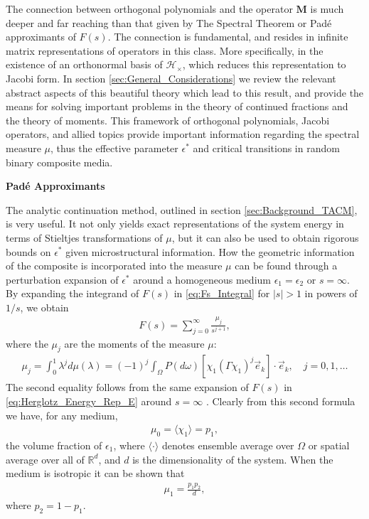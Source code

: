 \documentclass[english,12pt]{ttuthes}
\begin{document}
The connection between orthogonal polynomials and the operator
$\mathbf{M}$ is much deeper and far reaching than that given by The
Spectral Theorem or Pad\'{e} approximants of $F(s)$. The connection is
fundamental, and resides in infinite 
matrix representations of operators in this class. More specifically,
in the existence of an orthonormal basis of $\mathscr{H}_\times$, which
reduces this representation to Jacobi form. In
section \ref{sec:General_Considerations} we review the relevant
abstract aspects of this beautiful theory which lead to this
result, and provide the means for solving important problems in the
theory of continued fractions and the theory of moments. This
framework of orthogonal polynomials, Jacobi operators, and allied topics
provide important information regarding the spectral measure $\mu$, thus
the effective parameter $\epsilon^*$ and critical transitions in random binary
composite media.    

\noindent \textbf{Pad\'{e} Approximants}

The analytic continuation method, outlined in section
\ref{sec:Background_TACM}, is very useful. It not only yields exact
representations of the system energy in terms of Stieltjes
transformations of $\mu$, but it can also be used to obtain rigorous bounds
on $\epsilon^*$ given microstructural information. How the geometric
information of the composite is incorporated into 
the measure $\mu$ can be found through a perturbation expansion of $\epsilon^*$
around a homogeneous medium $\epsilon_1=\epsilon_2$ or $s=\infty$. By expanding the
integrand of $F(s)$ in \eqref{eq:Fs_Integral} for $|s|>1$ in powers of
$1/s$, we obtain \cite{Golden:JMP-5627}
%
\begin{align}\label{eq:Fs_near_infinity}
  F(s)=\sum_{j=0}^\infty\frac{\mu_j}{s^{j+1}},
\end{align}
%
where the $\mu_j$ are the moments of the measure $\mu$:
%
\begin{align}\label{eq:moments_mu}
  \mu_j=\int_0^1\lambda^jd\mu(\lambda)
     =(-1)^j\int_\Omega P(d\omega)[\chi_1(\Gamma\chi_1)^j\vec{e}_k]\cdot\vec{e}_k,
     \quad j=0,1,\ldots
\end{align}
%
The second equality follows from the same expansion of $F(s)$ in
\eqref{eq:Herglotz_Energy_Rep_E} around $s=\infty$
\cite{Golden:JMP-5627}. Clearly from this second formula we have, for
any medium, 
%
\begin{align}
\mu_0=\langle\chi_1\rangle=p_1,  
\end{align}
%
the volume fraction of $\epsilon_1$, where $\langle \cdot \rangle$ denotes ensemble average
over $\Omega$ or spatial average over all of ${\mathbb{R}}^d$, and $d$ is
the dimensionality of the system. When the medium is isotropic it can
be shown that \cite{Golden:CMP-473,Bruno:JSP-365}  
%
\begin{align}
  \mu_1=\frac{p_1p_2}{d},
\end{align}
%
where $p_2=1-p_1$.
\end{document}
